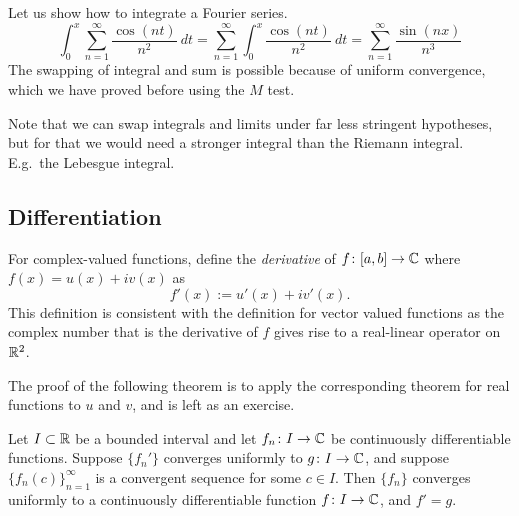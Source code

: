 \begin{example}
Let us show how to integrate a Fourier series.
\begin{equation*}
\int_{0}^x \sum_{n=1}^\infty \frac{\cos(nt)}{n^2} ~dt
=
\sum_{n=1}^\infty \int_{0}^x \frac{\cos(nt)}{n^2}~dt
=
\sum_{n=1}^\infty \frac{\sin(nx)}{n^3}
\end{equation*}
The swapping of integral and sum is possible because of uniform convergence,
which we have proved before using the $M$ test.
\end{example}

Note that we can swap integrals and limits under far less stringent hypotheses,
but for that we would need a stronger integral than the Riemann integral.
E.g.\ the Lebesgue integral.

\subsection{Differentiation}

For complex-valued functions, define the
\emph{derivative}
of $f \colon [a,b] \to
{\mathbb{C}}$ where $f(x) = u(x)+iv(x)$ as
\begin{equation*}
f'(x) := u'(x)+iv'(x) .
\end{equation*}
This definition is consistent with the definition for vector valued
functions as the complex number that is the derivative of $f$ gives rise to
a real-linear operator on ${\mathbb{R}}^2$.

The proof of the following theorem is to apply the corresponding theorem for
real functions to $u$ and $v$, and is left as an exercise.

\begin{thm} \label{thm:dersconvergecomplex}
Let $I \subset {\mathbb{R}}$ be a bounded interval and let
$f_n \colon I \to {\mathbb{C}}$ be continuously differentiable functions.
Suppose $\{ f_n' \}$ converges uniformly to $g \colon I \to {\mathbb{C}}$,
and suppose $\{ f_n(c) \}_{n=1}^\infty$ is a
convergent sequence for some $c \in I$.  Then $\{ f_n \}$ converges uniformly to 
a continuously differentiable function $f \colon I \to {\mathbb{C}}$, and $f' = g$.
\end{thm}


